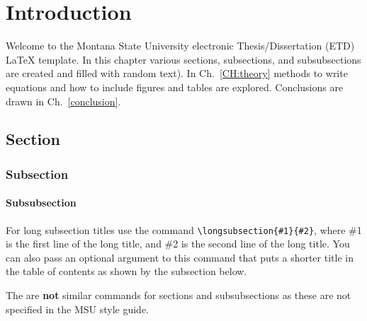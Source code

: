 \chapter{Introduction}\label{CH:introduction}
Welcome to the Montana State University electronic Thesis/Dissertation (ETD) \LaTeX{} template.  In this chapter various sections, subsections, and subsubsections are created and filled with random text).  In Ch.~\ref{CH:theory} methods to write equations and how to include figures and tables are explored. Conclusions are drawn in Ch.~\ref{conclusion}.


\section{Section}\label{Sect:test}
\lipsum[1] %

\subsection{Subsection}\label{Sect:testsub}
\lipsum[2] %

\subsubsection{Subsubsection}\label{Sect:testsubsub}
\lipsum[3] %

\label{Sect:longsub}
For long subsection titles use the command \verb|\longsubsection{#1}{#2}|, where \#1 is the first line of the long title, and \#2 is the second line of the long title. You can also pass an optional argument to this command that puts a shorter title in the table of contents as shown by the subsection below.

\label{Sect:longsub2}
The are \textbf{not} similar commands for sections and subsubsections as these are not specified in the MSU style guide.  
